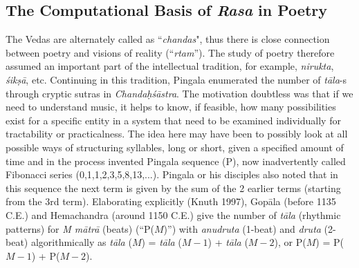 \subsection{The Computational Basis of \textsl{Rasa} in Poetry}\label{chap3-sec5.1}

The Vedas are alternately called as “\textsl{chandas}", thus there is close connection between poetry and visions of reality (“\textsl{rtam}”). The study of poetry therefore assumed an important part of the intellectual tradition, for example, \textsl{nirukta}, \textsl{śikṣā}, etc. Continuing in this tradition, Pingala enumerated the number of \textsl{tāla}-s through cryptic sutras in \textsl{Chandaḥśāstra}. The motivation doubtless was that if we need to understand music, it helps to know, if feasible, how many possibilities exist for a specific entity in a system that need to be examined individually for tractability or practicalness. The idea here may have been to possibly look at all possible ways of structuring syllables, long or short, given a specified amount of time and in the process invented Pingala sequence (P), now inadvertently called Fibonacci series (0,1,1,2,3,5,8,13,...). Pingala or his disciples also noted that in this sequence the next term is given by the sum of the 2 earlier terms (starting from the 3rd term). Elaborating explicitly (Knuth 1997), Gopāla (before 1135 C.E.) and Hemachandra (around 1150 C.E.) give the number of \textsl{tāla} (rhythmic patterns) for \textsl{M mātrā} (beats) (“P($M$)”) with \textsl{anudruta} (1-beat) and \textsl{druta} (2-beat) algorithmically as \textsl{tāla} ($M$) = \textsl{tāla} ($M-1$) + \textsl{tāla} ($M-2$), or P($M$) = P($M-1$) + P($M-2$).


